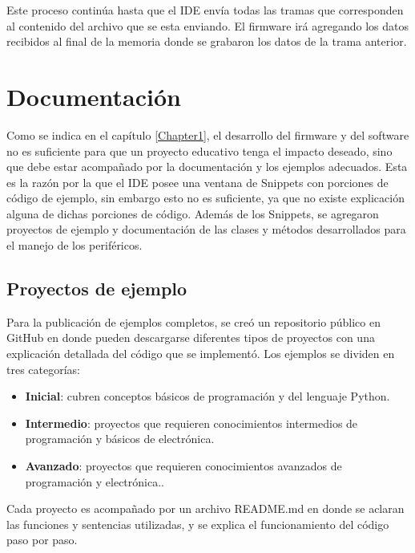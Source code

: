Este proceso continúa hasta que el IDE envía todas las tramas que corresponden al contenido del archivo que se esta enviando.
El firmware irá agregando los datos recibidos al final de la memoria donde se grabaron los datos de la trama anterior.



\section{Documentación}

Como se indica en el capítulo \ref{Chapter1}, el desarrollo del firmware y del software no es suficiente para que un proyecto educativo tenga el impacto deseado, sino que debe estar acompañado por la documentación y los ejemplos adecuados. Esta es la razón por la que el IDE posee una ventana de Snippets con porciones de código de ejemplo, sin embargo esto no es suficiente, ya que no existe explicación alguna de dichas porciones de código. 
Además de los Snippets, se agregaron proyectos de ejemplo y documentación de las clases y métodos desarrollados para el manejo de los periféricos.

\subsection{Proyectos de ejemplo} 

Para la publicación de ejemplos completos, se creó un repositorio público en GitHub\cite{repoejemplos} en donde pueden descargarse diferentes tipos de proyectos con una explicación detallada del código que se implementó. Los ejemplos se dividen en tres categorías:

\begin{itemize}
	\item \textbf{Inicial}: cubren conceptos básicos de programación y del lenguaje Python.
	\item \textbf{Intermedio}: proyectos que requieren conocimientos intermedios de programación y básicos de electrónica.
	\item \textbf{Avanzado}: proyectos que requieren conocimientos avanzados de programación y electrónica..	
\end{itemize}

Cada proyecto es acompañado por un archivo README.md en donde se aclaran las funciones y sentencias utilizadas, y se explica el funcionamiento del código paso por paso.

